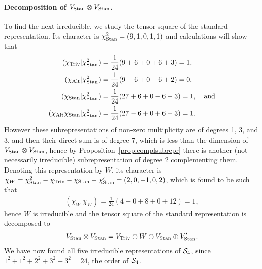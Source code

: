 {\begin{example}
	\paragraph{Decomposition of $V_{\text{Stan}} \otimes V_{\text{Stan}}$.} To find the next irreducible, we study the tensor square of the standard representation. Its character is $\chi_{\text{Stan}}^2 = (9,1,0,1,1)$ and calculations will show that
	\begin{align*}
		(\chi_{\text{Triv}} | \chi_{\text{Stan}}^2) & = \frac{1}{24}(9 + 6 + 0 + 6 + 3) = 1, \\
		(\chi_{\text{Alt}} | \chi_{\text{Stan}}^2)  &= \frac{1}{24}(9-6+0-6+2) = 0, \\
		(\chi_{\text{Stan}} | \chi_{\text{Stan}}^2)  &= \frac{1}{24}(27+6+0-6-3) = 1, \quad \text{and} \\
		(\chi_{\text{Alt}}\chi_{\text{Stan}} | \chi_{\text{Stan}}^2)  &= \frac{1}{24}(27-6+0+6-3) = 1.
	\end{align*}
	However these subrepresentations of non-zero multiplicity are of degrees 1, 3, and 3, and then their direct sum is of degree 7, which is less than the dimension of $V_{\text{Stan}} \otimes V_{\text{Stan}}$, hence by Proposition~\ref{prop:complsubrepr} there is another (not necessarily irreducible) subrepresentation of degree 2 complementing them. Denoting this representation by $W$, its character is $\chi_W = \chi_{\text{Stan}}^2 - \chi_{\text{Triv}} - \chi_{\text{Stan}} - \chi'_{\text{Stan}} = (2,0,-1,0,2)$, which is found to be such that 
	\begin{align*}
		(\chi_W|\chi_W) = \frac{1}{24}(4 + 0 + 8 + 0 + 12) = 1,
	\end{align*}
	hence $W$ is irreducible and the tensor square of the standard representation is decomposed to 
	\begin{align*}
		V_{\text{Stan}} \otimes V_{\text{Stan}} = V_{\text{Triv}} \oplus W \oplus V_{\text{Stan}} \oplus V'_{\text{Stan}}.
	\end{align*}
	We have now found all five irreducible representations of $\mathcal{S}_4$, since $1^2 + 1^2 +  2^2 + 3^2 + 3^2 = 24$, the order of $\mathcal{S}_4$.

\end{example}}
